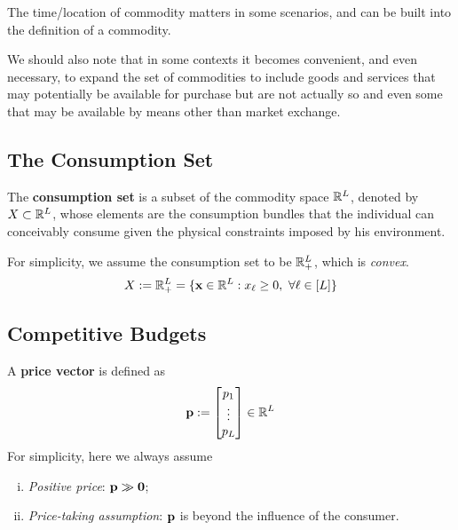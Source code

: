 \documentclass{article}
\begin{document}
 			\begin{remark}
 				The time/location of commodity matters in some scenarios, and can be built into the definition of a commodity.
 			\end{remark}
 			
 			\begin{remark}
 				We should also note that in some contexts it becomes convenient, and even necessary, to expand the set of commodities to include goods and services that may potentially be available for purchase but are not actually so and even some that may be available by means other than market exchange.
 			\end{remark}
 		
 		\subsection{The Consumption Set}
 			\begin{definition}
 				The \textbf{consumption set} is a subset of the commodity space $\mathbb{R}^L$, denoted by $X \subset \mathbb{R}^L$, whose elements are the consumption bundles that the individual can conceivably consume given the physical constraints imposed by his environment.
 			\end{definition}
 			
 			\begin{assumption}
 				For simplicity, we assume the consumption set to be $\mathbb{R}_+^L$, which is \emph{convex}.
 				\begin{equation}
 					X := \mathbb{R}_+^L = \{\textbf{x} \in \mathbb{R}^L: x_{\ell} \geq 0,\ \forall \ell \in [L]\}
 				\end{equation}
 			\end{assumption}
 			
 		\subsection{Competitive Budgets}
 			\begin{definition}
 				A \textbf{price vector} is defined as
 				\begin{equation}
 					\textbf{p} := \begin{bmatrix} p_1 \\ \vdots \\ p_L \end{bmatrix} \in \mathbb{R}^L
 				\end{equation}
 				For simplicity, here we always assume 
 				\begin{enumerate}[(i)]
 					\item \emph{Positive price}: $\textbf{p} \gg \textbf{0}$;
 					\item \emph{Price-taking assumption}: $\textbf{p}$ is beyond the influence of the consumer.
 				\end{enumerate}
 			\end{definition}
 			
\end{document}
